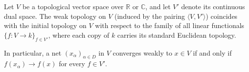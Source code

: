 \begin{proposition} \label{proposition:weak_topology_is_initial_topology}
    Let $V$ be a topological vector space over $\mathbb{R}$ or $\mathbb{C}$, and let $V'$ denote its continuous dual space. The weak topology on $V$ (induced by the pairing $\langle V, V' \rangle$) coincides with the initial topology on $V$ with respect to the family of all linear functionals $\{f : V \to k\}_{f \in V'}$, where each copy of $k$ carries its standard Euclidean topology.

    In particular, a net $(x_\alpha)_{\alpha \in D}$ in $V$ converges weakly to $x \in V$ if and only if $f(x_\alpha) \to f(x)$ for every $f \in V'$.
\end{proposition}
